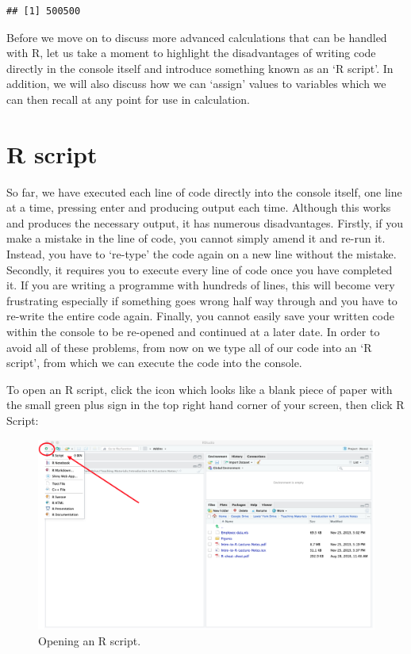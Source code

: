 \documentclass[
]{book}
\theoremstyle{definition}
\theoremstyle{definition}
\theoremstyle{definition}
\theoremstyle{definition}
\theoremstyle{remark}
\begin{document}
\begin{verbatim}
## [1] 500500
\end{verbatim}

Before we move on to discuss more advanced calculations that can be handled with R, let us take a moment to highlight the disadvantages of writing code directly in the console itself and introduce something known as an `R script'. In addition, we will also discuss how we can `assign' values to variables which we can then recall at any point for use in calculation.

\hypertarget{r-script}{%
\section{R script}\label{r-script}}

So far, we have executed each line of code directly into the console itself, one line at a time, pressing enter and producing output each time. Although this works and produces the necessary output, it has numerous disadvantages. Firstly, if you make a mistake in the line of code, you cannot simply amend it and re-run it. Instead, you have to `re-type' the code again on a new line without the mistake. Secondly, it requires you to execute every line of code once you have completed it. If you are writing a programme with hundreds of lines, this will become very frustrating especially if something goes wrong half way through and you have to re-write the entire code again. Finally, you cannot easily save your written code within the console to be re-opened and continued at a later date. In order to avoid all of these problems, from now on we type all of our code into an `R script', from which we can execute the code into the console.

To open an R script, click the icon which looks like a blank piece of paper with the small green plus sign in the top right hand corner of your screen, then click R Script:

\begin{figure}

{\centering \includegraphics[width=0.7\linewidth]{Figures/Script} 

}

\caption{Opening an R script.}\label{fig:Script}
\end{figure}
\end{document}
